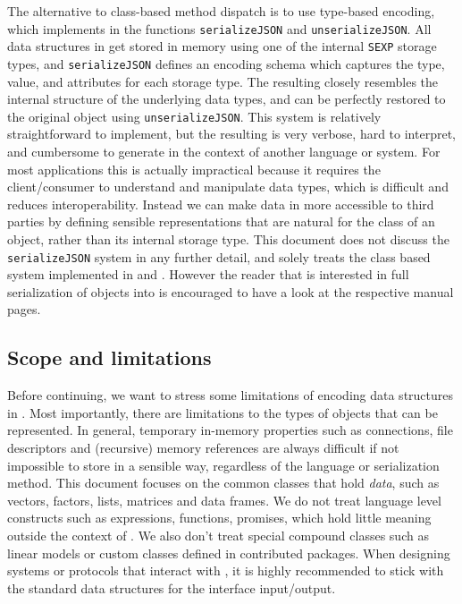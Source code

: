 The alternative to class-based method dispatch is to use type-based encoding, which \jsonlite implements in the functions \texttt{serializeJSON} and \texttt{unserializeJSON}. All data structures in \R get stored in memory using one of the internal \texttt{SEXP} storage types, and \texttt{serializeJSON} defines an encoding schema which captures the type, value, and attributes for each storage type. The resulting \JSON closely resembles the internal structure of the underlying \C data types, and can be perfectly restored to the original \R object using \texttt{unserializeJSON}. This system is relatively straightforward to implement, but the resulting \JSON is very verbose, hard to interpret, and cumbersome to generate in the context of another language or system. For most applications this is actually impractical because it requires the client/consumer to understand and manipulate \R data types, which is difficult and reduces interoperability. Instead we can make data in \R more accessible to third parties by defining sensible \JSON representations that are natural for the class of an object, rather than its internal storage type. This document does not discuss the \texttt{serializeJSON} system in any further detail, and solely treats the class based system implemented in \toJSON and \fromJSON. However the reader that is interested in full serialization of \R objects into \JSON is encouraged to have a look at the respective manual pages.

\subsection{Scope and limitations}

Before continuing, we want to stress some limitations of encoding \R data structures in \JSON. Most importantly, there are limitations to the types of objects that can be represented. In general, temporary in-memory properties such as connections, file descriptors and (recursive) memory references are always difficult if not impossible to store in a sensible way, regardless of the language or serialization method. This document focuses on the common \R classes that hold \emph{data}, such as vectors, factors, lists, matrices and data frames. We do not treat language level constructs such as expressions, functions, promises, which hold little meaning outside the context of \R.  We also don't treat special compound classes such as linear models or custom classes defined in contributed packages. When designing systems or protocols that interact with \R, it is highly recommended to stick with the standard data structures for the interface input/output.

